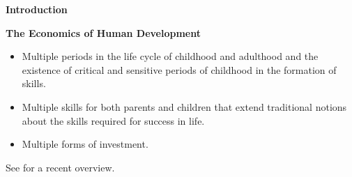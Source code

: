 \begin{frame}\begin{center}
\LARGE\textbf{Introduction}
\end{center}\end{frame}
\begin{frame}\textbf{The Economics of Human Development}\vspace{0.3cm}

\begin{itemize}\setlength\itemsep{1em}
\item Multiple periods in the life cycle of childhood and adulthood and the existence of critical and sensitive periods of childhood in the formation of skills.
\item Multiple skills for both parents and children that extend traditional notions about the skills required for success in life.
\item Multiple forms of investment.
\end{itemize}\vspace{0.3cm}

See  for a recent overview.

\end{frame}
